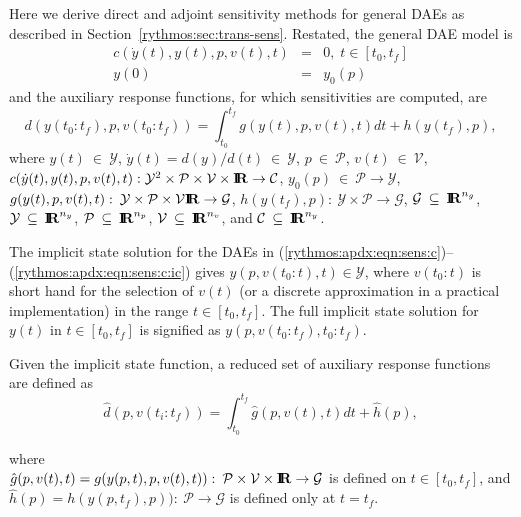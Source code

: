 \documentclass[pdf,ps2pdf,11pt]{SANDreport}
\begin{document}
Here we derive direct and adjoint sensitivity methods for general DAEs as
described in Section~\ref{rythmos:sec:trans-sens}.  Restated, the general DAE
model is
%
\begin{eqnarray}
c\left( \dot{y}(t), y(t), p, v(t), t \right) & = & 0,
\; t \in \left[ t_0, t_f \right] \label{rythmos:apdx:eqn:sens:c} \\
y(0) & = & y_0(p) \label{rythmos:apdx:eqn:sens:c:ic}
\end{eqnarray}
%
and the auxiliary response functions, for which sensitivities are computed, are
%
\begin{equation}
d(y(t_0:t_f),p,v(t_0:t_f))
= \int_{t_0}^{t_f} g(y(t),p,v(t),t) dt + h(y(t_f),p),
\label{rythmos:apdx:eqn:sens:d}
\end{equation}
%
where $y(t){}\:\in\:\mathcal{Y}$, $\dot{y}(t) = d(y)/d(t)\:\in\:\mathcal{Y}$,
$p{}\:\in\:\mathcal{P}$, $v(t){}\:\in\:\mathcal{V}$, $c(\dot{y}(t), y(t), p,
v(t), t)
:{}\mathcal{Y}^2{}\times{}\mathcal{P}{}\times{}\mathcal{V}{}\times{}\mbox{\textbf{I}}\hspace{-0.6ex}\mbox{\textbf{R}}
{}\rightarrow{}\mathcal{C}$,
$y_0(p){}\:\in\:\mathcal{P}{}\rightarrow{}\mathcal{Y}$, $g(y(t),p,v(t),t)
:{}\: {}\mathcal{Y}{}\times{}\mathcal{P}{}\times{}\mathcal{V}{}\mbox{\textbf{I}}\hspace{-0.6ex}\mbox{\textbf{R}}
{}\rightarrow{}\mathcal{G}$, $h(y(t_f),p) :{}\:
{}\mathcal{Y}{}\times{}\mathcal{P} {}\rightarrow{}\mathcal{G}$,
$\mathcal{G}{}\:\subseteq\:\mbox{\textbf{I}}\hspace{-0.6ex}\mbox{\textbf{R}}^{n_g}$, $\mathcal{Y}{}\:\subseteq\:\mbox{\textbf{I}}\hspace{-0.6ex}\mbox{\textbf{R}}^{n_y}$,
$\mathcal{P}{}\:\subseteq\:\mbox{\textbf{I}}\hspace{-0.6ex}\mbox{\textbf{R}}^{n_p}$, $\mathcal{V}{}\:\subseteq\:\mbox{\textbf{I}}\hspace{-0.6ex}\mbox{\textbf{R}}^{n_v}$,
and $\mathcal{C}{}\:\subseteq\:\mbox{\textbf{I}}\hspace{-0.6ex}\mbox{\textbf{R}}^{n_y}$.

The implicit state solution for the DAEs in
(\ref{rythmos:apdx:eqn:sens:c})--(\ref{rythmos:apdx:eqn:sens:c:ic}) gives
$y(p,v(t_0:t),t)\in\mathcal{Y}$, where $v(t_0:t)$ is short hand for the
selection of $v(t)$ (or a discrete approximation in a practical
implementation) in the range $t\in[t_0,t_f]$.  The full implicit state
solution for $y(t)$ in $t\in[t_0,t_f]$ is signified as
$y(p,v(t_0:t_f),t_0:t_f)$.

Given the implicit state function, a reduced set of auxiliary response
functions are defined as
%
\begin{equation}
\hat{d}(p,v(t_i:t_f))
= \int_{t_0}^{t_f} \hat{g}(p,v(t),t) dt + \hat{h}(p),
\label{rythmos:apdx:eqn:sens:d_hat}
\end{equation}
\begin{tabbing}
\hspace{4ex}where\hspace{1ex}\= \\
\>	$\hat{g}(p,v(t),t) = g(y(p,t),p,v(t),t)) : \:
		\mathcal{P} \times \mathcal{V} \times \mbox{\textbf{I}}\hspace{-0.6ex}\mbox{\textbf{R}} \rightarrow \mathcal{G}$ is defined on $t\in[t_0,t_f]$, and \\
\>	$\hat{h}(p) = h(y(p,t_f),p)) : \:
		\mathcal{P} \rightarrow \mathcal{G}$ is defined only at $t=t_f$.
\end{tabbing}
\end{document}
